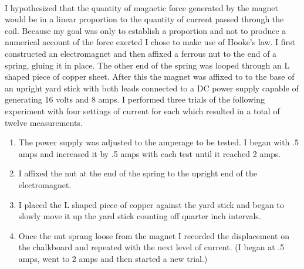 \documentclass{article}
\begin{document}
\paragraph{}
I hypothesized that the quantity of magnetic force generated by the magnet would be in a linear proportion to the quantity of current passed through the coil. Because my goal was only to establish a proportion and not to produce a numerical account of the force exerted I chose to make use of Hooke's law. I first constructed an electromagnet and then affixed a ferrous nut to the end of a spring, gluing it in place. The other end of the spring was looped through an L shaped piece of copper sheet. After this the magnet was affixed to to the base of an upright yard stick with both leads connected to a DC power supply capable of generating 16 volts and 8 amps. I performed three trials of the following experiment with four settings of current for each which resulted in a total of twelve measurements.
\begin{enumerate}
    \item The power supply was adjusted to the amperage to be tested. I began with .5 amps and increased it by .5 amps with each test until it reached 2 amps. 
    \item I affixed the nut at the end of the spring to the upright end of the electromagnet.
    \item I placed the L shaped piece of copper against the yard stick and began to slowly move it up the yard stick counting off quarter inch intervals. 
    \item Once the nut sprang loose from the magnet I recorded the displacement on the chalkboard and repeated with the next level of current. (I began at .5 amps, went to 2 amps and then started a new trial.)
\end{enumerate}
\end{document}
